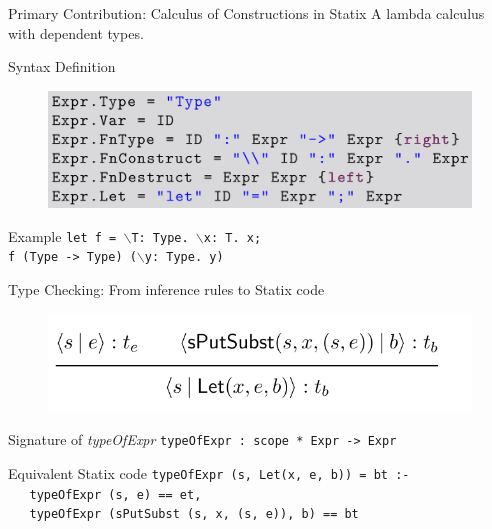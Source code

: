 \documentclass[aspectratio=43]{beamer}
\begin{document}
\begin{frame}[fragile]{Primary Contribution: Calculus of Constructions in Statix}
	A lambda calculus with dependent types.
	
	\begin{block}{Syntax Definition}
		\begin{figure}
			\includegraphics[width=0.7\linewidth]{img/screenshot006}
		\end{figure}
	\end{block}

	\begin{exampleblock}{Example}
		\texttt{let f = $\backslash$T: Type. $\backslash$x: T. x; \\
f (Type -> Type) ($\backslash$y: Type. y)
		}
	\end{exampleblock}

\end{frame}

\begin{frame}[fragile]{Type Checking: From inference rules to Statix code}
	\begin{figure}
		\centering
		\includegraphics[width=0.8\linewidth]{img/screenshot004}
	\end{figure}
	
	\begin{block}{Signature of \emph{typeOfExpr}}
		\texttt{typeOfExpr : scope * Expr -> Expr}
	\end{block}
	
	\begin{exampleblock}{Equivalent Statix code} 
		\texttt{typeOfExpr (s, Let(x, e, b)) = bt :-\\
			\,\, typeOfExpr (s, e) == et, \\
			\,\, typeOfExpr (sPutSubst (s, x, (s, e)), b) == bt}
	\end{exampleblock}
\end{frame}
\end{document}
